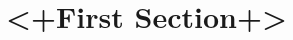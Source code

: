 \documentclass[a4paper]{article}
\title{\bf \maintitle\\
  \vspace{1cm}
  {\large
    \subtitle%
  }
}
\author{Nikolas Schroeder\\
  Institute for Systems Theory and Automatic Control\\
  \texttt{lrt86824@stud.uni-stuttgart.de}%
}
\date{\today}
\begin{document}
\maketitle

\hrulefill
\begin{abstract}
<+Abstract+>
\end{abstract}

\hrulefill

\pagebreak

\section{<+First Section+>}

{\small


}
\end{document}
